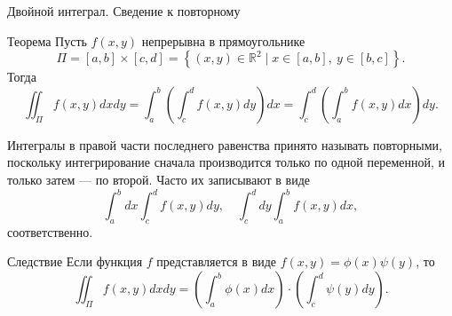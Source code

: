 \documentclass[8pt]{beamer}
\begin{document}

\begin{frame}{Двойной интеграл. Сведение к повторному}
\begin{block}{Теорема}
Пусть $f(x,y)$ непрерывна в прямоугольнике 
$$\Pi =[a,b]\times[c,d] =\left\{ (x,y)\in\mathbb{R}^2 \mid
 x\in[a,b],\ y\in[b,c] \right\}.$$
Тогда
$$\iint_\Pi f(x,y)dxdy = \int_a^b\left( \int_c^d f(x,y)dy \right) dx = \int_c^d\left( \int_a^b f(x,y)dx \right) dy.$$
\end{block}
Интегралы в правой части последнего равенства принято называть повторными, поскольку интегрирование сначала производится только по одной переменной, и только затем --- по второй. Часто их записывают в виде
$$\int_a^b dx \int_c^d f(x,y)dy,\quad \int_c^d dy \int_a^b f(x,y)dx,$$
соответственно.
\begin{block}{Следствие}
Если функция $f$ представляется в виде $f(x,y) = \phi(x)\psi(y)$, то
$$\iint_\Pi f(x,y)dxdy =  \left( \int_a^b \phi(x) dx \right) \cdot \left( \int_c^d \psi(y) dy \right).$$
\end{block}
\end{frame}
\end{document}
